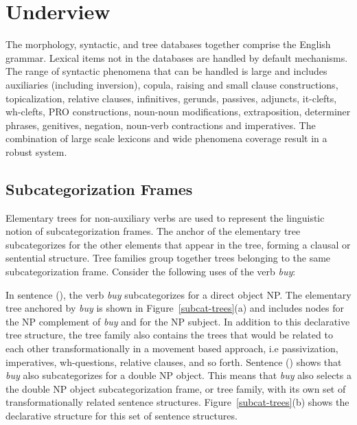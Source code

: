 \section{Underview}

The morphology, syntactic, and tree databases together comprise the English
grammar.  Lexical items not in the databases are handled by default mechanisms.
The range of syntactic phenomena that can be handled is large and includes
auxiliaries (including inversion), copula, raising and small clause
constructions, topicalization, relative clauses, infinitives, gerunds,
passives, adjuncts, it-clefts, wh-clefts, PRO constructions, noun-noun
modifications, extraposition, determiner phrases, genitives, negation,
noun-verb contractions and imperatives.  The combination of large scale
lexicons and wide phenomena coverage result in a robust system.


\subsection{Subcategorization Frames}
\label{subcat-frames}

Elementary trees for non-auxiliary verbs are used to represent the linguistic
notion of subcategorization frames.  The anchor of the elementary tree
subcategorizes for the other elements that appear in the tree, forming a
clausal or sentential structure.  Tree families group together trees belonging
to the same subcategorization frame.  Consider the following uses of the verb
{\it buy}:


In sentence (), the verb {\it buy} subcategorizes for a direct object NP.
The elementary tree anchored by {\it buy} is shown in
Figure~\ref{subcat-trees}(a) and includes nodes for the NP complement of {\it
buy} and for the NP subject.  In addition to this declarative tree structure,
the tree family also contains the trees that would be related to each other
transformationally in a movement based approach, i.e passivization,
imperatives, wh-questions, relative clauses, and so forth.  Sentence ()
shows that {\it buy} also subcategorizes for a double NP object.  This means
that {\it buy} also selects a the double NP object subcategorization frame, or
tree family, with its own set of transformationally related sentence
structures.  Figure~\ref{subcat-trees}(b) shows the declarative structure for
this set of sentence structures.

